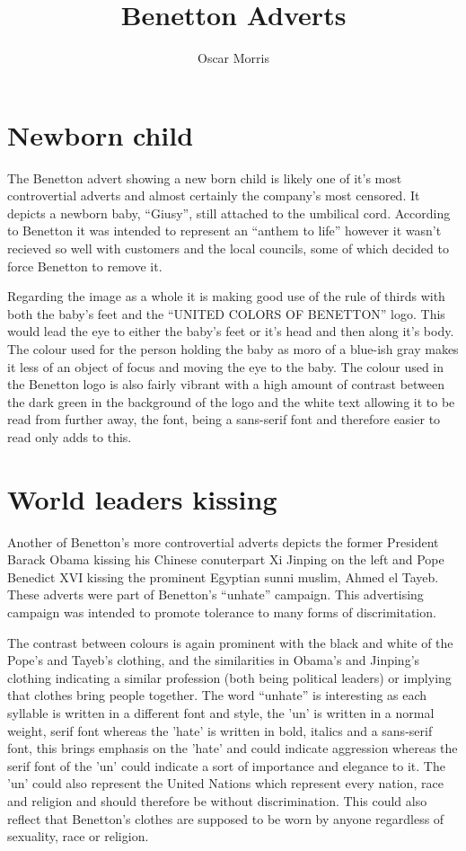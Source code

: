 \documentclass[11pt]{article}
\author{Oscar Morris}
\date{}
\title{Benetton Adverts}
\begin{document}
\maketitle

\section{Newborn child}
\label{sec:org0c6ea81}
The Benetton advert showing a new born child is likely one of it's most controvertial adverts and almost certainly the company's most censored. It depicts a newborn baby, ``Giusy'', still attached to the umbilical cord. According to Benetton it was intended to represent an ``anthem to life'' however it wasn't recieved so well with customers and the local councils, some of which decided to force Benetton to remove it.

Regarding the image as a whole it is making good use of the rule of thirds with both the baby's feet and the ``UNITED COLORS OF BENETTON'' logo. This would lead the eye to either the baby's feet or it's head and then along it's body. The colour used for the person holding the baby as moro of a blue-ish gray makes it less of an object of focus and moving the eye to the baby. The colour used in the Benetton logo is also fairly vibrant with a high amount of contrast between the dark green in the background of the logo and the white text allowing it to be read from further away, the font, being a sans-serif font and therefore easier to read only adds to this.

\section{World leaders kissing}
\label{sec:orgf29cb3a}
Another of Benetton's more controvertial adverts depicts the former President Barack Obama kissing his Chinese conuterpart Xi Jinping on the left and Pope Benedict XVI kissing the prominent Egyptian sunni muslim, Ahmed el Tayeb. These adverts were part of Benetton's ``unhate'' campaign. This advertising campaign was intended to promote tolerance to many forms of discrimitation.

The contrast between colours is again prominent with the black and white of the Pope's and Tayeb's clothing, and the similarities in Obama's and Jinping's clothing indicating a similar profession (both being political leaders) or implying that clothes bring people together. The word ``unhate'' is interesting as each syllable is written in a different font and style, the 'un' is written in a normal weight, serif font whereas the 'hate' is written in bold, italics and a sans-serif font, this brings emphasis on the 'hate' and could indicate aggression whereas the serif font of the 'un' could indicate a sort of importance and elegance to it. The 'un' could also represent the United Nations which represent every nation, race and religion and should therefore be without discrimination. This could also reflect that Benetton's clothes are supposed to be worn by anyone regardless of sexuality, race or religion.
\end{document}
